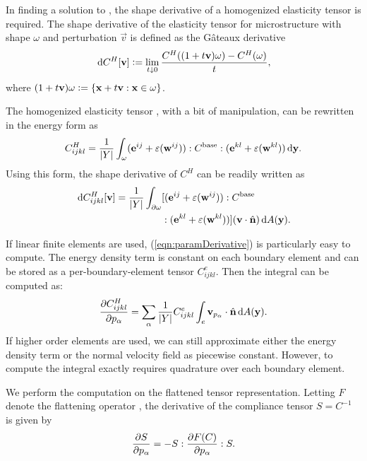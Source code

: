 \documentclass[twocolumn,10pt]{article}
\begin{document}
In finding a solution to , the shape derivative of a
homogenized elasticity tensor is required. The shape derivative of the
elasticity tensor for microstructure with shape $\omega$ and
perturbation $\vec{v}$ is defined as the G\^ateaux derivative
\cite{zolesio2001shapes}
\begin{equation}
  \, \mathrm{d} C^H[\mathbf v] \vcentcolon= \lim_{t\downarrow 0} \frac{C^H((1+t\mathbf v)\omega)-C^H(\omega)}{t},
\end{equation}
where $(1+t\mathbf v)\omega \vcentcolon= \{\mathbf x+t\mathbf v : \mathbf x \in \omega\}$.

The homogenized elasticity tensor , with a bit of
manipulation, can be rewritten in the energy form as
\begin{equation}
  \label{eqn:EhEnergy}
  C^H_{ijkl} = \frac{1}{|Y|} \int_\omega (\mathbf e^{ij} +
  \varepsilon(\mathbf w^{ij})) : C^\text{base} : (\mathbf e^{kl} +
  \varepsilon(\mathbf w^{kl})) \, \mathrm{d} \mathbf y.
\end{equation}
Using this form, the shape derivative of $C^H$ can be readily written as
\begin{align}
  \label{eqn:paramDerivative}
  \, \mathrm{d} C^H_{ijkl}[\mathbf v] =
  \frac{1}{|Y|} \int_{\partial \omega} &[(\mathbf e^{ij} + \varepsilon(\mathbf w^{ij})) : C^\text{base}\\
    &: (\mathbf e^{kl} + \varepsilon(\mathbf w^{kl}))] (\mathbf v \cdot \hat{\mathbf n}) \, \mathrm{d}A(\mathbf y).\notag
\end{align}

 If linear finite elements are used,
(\ref{eqn:paramDerivative}) is particularly easy to compute. The
energy density term is constant on each boundary element and can be
stored as a per-boundary-element tensor $C^e_{ijkl}$.  Then the
integral can be computed as:
\begin{equation}
\pder{C^H_{ijkl}}{p_\alpha} =
\sum_\alpha \frac{1}{|Y|} C^e_{ijkl} \int_e \vec{v}_{p_\alpha} \cdot \hat{{\bf n}} \dA({\y}). %
\end{equation}
If higher order elements are used, we can still approximate either the
energy density term or the normal velocity field as piecewise
constant. However, to compute the integral exactly requires quadrature
over each boundary element.

We perform the computation on
the flattened tensor representation. Letting $F$ denote the flattening
operator , the derivative of the compliance tensor
$S=C^{-1}$ is given by
\begin{align}
    \frac{\partial S}{\partial p_\alpha} = -S : \frac{\partial F(C)}{\partial p_\alpha} : S.
\end{align}



\end{document}
